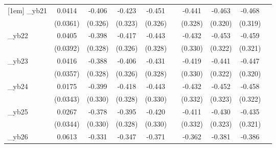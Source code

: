 \begin{table}[htbp]
\begin{tabular}{l*{9}{c}}
[1em]
\_yb21       &      0.0414         &      -0.406         &      -0.423         &      -0.451         &                     &      -0.441         &      -0.463         &      -0.468         &                     \\
            &    (0.0361)         &     (0.326)         &     (0.323)         &     (0.326)         &                     &     (0.328)         &     (0.320)         &     (0.319)         &                     \\
[1em]
\_yb22       &      0.0405         &      -0.398         &      -0.417         &      -0.443         &                     &      -0.432         &      -0.453         &      -0.459         &                     \\
            &    (0.0392)         &     (0.328)         &     (0.326)         &     (0.328)         &                     &     (0.330)         &     (0.322)         &     (0.321)         &                     \\
[1em]
\_yb23       &      0.0416         &      -0.388         &      -0.406         &      -0.431         &                     &      -0.419         &      -0.441         &      -0.447         &                     \\
            &    (0.0357)         &     (0.328)         &     (0.326)         &     (0.328)         &                     &     (0.330)         &     (0.322)         &     (0.320)         &                     \\
[1em]
\_yb24       &      0.0175         &      -0.399         &      -0.418         &      -0.443         &                     &      -0.432         &      -0.452         &      -0.458         &                     \\
            &    (0.0343)         &     (0.330)         &     (0.328)         &     (0.330)         &                     &     (0.332)         &     (0.323)         &     (0.322)         &                     \\
[1em]
\_yb25       &      0.0267         &      -0.378         &      -0.395         &      -0.420         &                     &      -0.411         &      -0.430         &      -0.435         &                     \\
            &    (0.0344)         &     (0.330)         &     (0.328)         &     (0.330)         &                     &     (0.332)         &     (0.323)         &     (0.321)         &                     \\
[1em]
\_yb26       &      0.0613         &      -0.331         &      -0.347         &      -0.371         &                     &      -0.362         &      -0.381         &      -0.386         &                     \\

\end{tabular}
\end{table}
